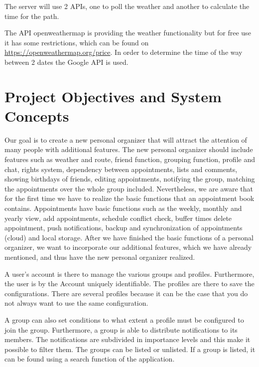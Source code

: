 \documentclass[12pt]{scrartcl}
\begin{document}
        The server will use 2 APIs, one to poll the weather and another to calculate the time for the path.

        The API openweathermap is providing the weather functionality 
        but for free use it has some restrictions, which can be found on \href{https://openweathermap.org/price}{https://openweathermap.org/price}.
        In order to determine the time of the way between 2 dates the Google API is used.
        \pagebreak

    \section{Project Objectives and System Concepts}

        Our goal is to create a new personal organizer that will attract the attention of many people with additional features.
        The new personal organizer should include features such as weather and route, friend function, grouping function, 
        profile and chat, rights system, dependency between appointments, lists and comments, showing birthdays of friends,
        editing appointments, notifying the group, matching the appointments over the whole group included.
        Nevertheless, we are aware that for the first time we have to realize the basic functions that an appointment book contains.
        Appointments have basic functions such as the weekly, monthly and yearly view, add appointments, schedule conflict check, buffer times
        delete appointment, push notifications, backup and synchronization of appointments (cloud) and local storage.
        After we have finished the basic functions of a personal organizer, we want to incorporate our additional features, which we have already mentioned, 
        and thus have the new personal organizer realized.

        A user's account is there to manage the various groups and profiles. Furthermore, the user is by the
        Account uniquely identifiable.
        The profiles are there to save the configurations. There are several profiles because it can be the case that you do not always want to use the same configuration.
        
        A group can also set conditions to what extent a profile must be configured to join the group.
        Furthermore, a group is able to distribute notifications to its members. 
        The notifications are subdivided in importance levels and this make it possible to 
        filter them.
        The groups can be listed or unlisted. If a group is listed, it can be found using a search function of the application.
        
\end{document}
